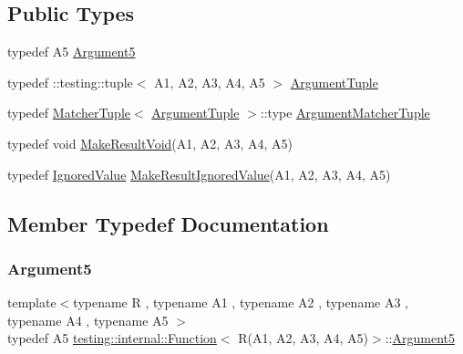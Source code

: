 \subsection*{Public Types}
\begin{DoxyCompactItemize}
\item 
typedef A5 \mbox{\hyperlink{structtesting_1_1internal_1_1Function_3_01R_07A1_00_01A2_00_01A3_00_01A4_00_01A5_08_4_a5bc0279c43aa98c409219dee1b815c71}{Argument5}}
\item 
typedef \+::testing\+::tuple$<$ A1, A2, A3, A4, A5 $>$ \mbox{\hyperlink{structtesting_1_1internal_1_1Function_3_01R_07A1_00_01A2_00_01A3_00_01A4_00_01A5_08_4_af5a1487829347eae2a48b2f66f216f52}{Argument\+Tuple}}
\item 
typedef \mbox{\hyperlink{structtesting_1_1internal_1_1MatcherTuple}{Matcher\+Tuple}}$<$ \mbox{\hyperlink{structtesting_1_1internal_1_1Function_3_01R_07_08_4_ad483c3128c470d8cdb55c3ac1c575c11}{Argument\+Tuple}} $>$\+::type \mbox{\hyperlink{structtesting_1_1internal_1_1Function_3_01R_07A1_00_01A2_00_01A3_00_01A4_00_01A5_08_4_a03c18380538e53141227afe6d0f20cc8}{Argument\+Matcher\+Tuple}}
\item 
typedef void \mbox{\hyperlink{structtesting_1_1internal_1_1Function_3_01R_07A1_00_01A2_00_01A3_00_01A4_00_01A5_08_4_a2903acde18de33d756eef4d43d843c04}{Make\+Result\+Void}}(A1, A2, A3, A4, A5)
\item 
typedef \mbox{\hyperlink{classtesting_1_1internal_1_1IgnoredValue}{Ignored\+Value}} \mbox{\hyperlink{structtesting_1_1internal_1_1Function_3_01R_07A1_00_01A2_00_01A3_00_01A4_00_01A5_08_4_a552ce4ec27e2d09fa1c133c66f72d7b3}{Make\+Result\+Ignored\+Value}}(A1, A2, A3, A4, A5)
\end{DoxyCompactItemize}


\subsection{Member Typedef Documentation}
\mbox{\label{structtesting_1_1internal_1_1Function_3_01R_07A1_00_01A2_00_01A3_00_01A4_00_01A5_08_4_a5bc0279c43aa98c409219dee1b815c71}} 
\subsubsection{\texorpdfstring{Argument5}{Argument5}}
{\footnotesize\ttfamily template$<$typename R , typename A1 , typename A2 , typename A3 , typename A4 , typename A5 $>$ \\
typedef A5 \mbox{\hyperlink{structtesting_1_1internal_1_1Function}{testing\+::internal\+::\+Function}}$<$ R(A1, A2, A3, A4, A5)$>$\+::\mbox{\hyperlink{structtesting_1_1internal_1_1Function_3_01R_07A1_00_01A2_00_01A3_00_01A4_00_01A5_08_4_a5bc0279c43aa98c409219dee1b815c71}{Argument5}}}

